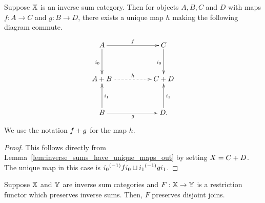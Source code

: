\begin{corollary}\label{cor:inverse_sums_have_unique_maps}
  Suppose $\mathbb{X}$ is an inverse sum category. Then for objects $A,B,C$ and $D$ with maps $f:A\to C$
  and $g:B\to D$, there exists a unique map $h$ making the following diagram commute.
  \[
    \xymatrix@R+10pt@C+28pt {
      A \ar[r]^{f} \ar[d]_{i_0}
        & C \ar[d]_{i_0} \\
      \invsum{A}{B} \ar@{.>}[r]^{h}
        & \invsum{C}{D}\\
      B \ar[r]_{g} \ar[u]_{i_1}
        & D \ar[u]_{i_1}\text{.}
    }
  \]
  We use the notation ${{f}+{g}}$ for the map $h$.
\end{corollary}
\begin{proof}
  This follows directly from Lemma~\ref{lem:inverse_sums_have_unique_maps_out} by setting
  $X = {{C}+{D}}$. The unique map in this case is ${i_0}^{(-1)} f i_0 \sqcup {i_1}^{(-1)} g i_1$.
\end{proof}
\begin{lemma}\label{lem:functor_preserving_inverse_sums_preserves_joins}
  Suppose $\mathbb{X}$ and $\mathbb{Y}$ are inverse sum categories and $F:\mathbb{X} \to \mathbb{Y}$ is a restriction functor which
  preserves inverse sums. Then, $F$ preserves disjoint joins.
\end{lemma}
